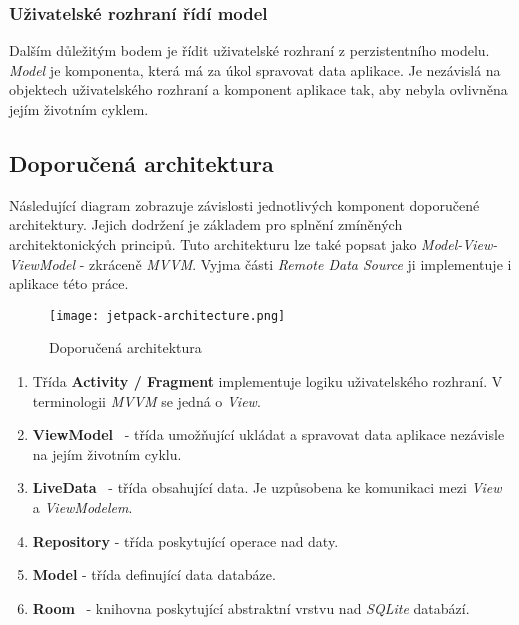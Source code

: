        \subsubsection{Uživatelské rozhraní řídí model}
        Dalším důležitým bodem je řídit uživatelské rozhraní z perzistentního modelu. \emph{Model} je komponenta, která má za úkol spravovat data aplikace. Je nezávislá na objektech uživatelského rozhraní a komponent aplikace tak, aby nebyla ovlivněna jejím životním cyklem.

        \newpage
        \subsection{Doporučená architektura}
        Následující diagram zobrazuje závislosti jednotlivých komponent doporučené architektury. Jejich dodržení je základem pro splnění zmíněných architektonických principů. Tuto architekturu lze také popsat jako \emph{Model-View-ViewModel} - zkráceně \emph{MVVM}. Vyjma části \emph{Remote Data Source} ji implementuje i aplikace této práce.

        \begin{figure}[h!]
            \centering
            \vspace{0.5cm}
            \texttt{[image: jetpack-architecture.png]}
            \caption[Architektura aplikace]{Doporučená architektura~\cite{app-architecture-guide}}
            \label{diagram:jetpack_arch}
        \end{figure}
        
        \begin{enumerate}
            \item Třída \textbf{Activity / Fragment} implementuje logiku uživatelského rozhraní. V terminologii \emph{MVVM} se jedná o \emph{View}.
            \item \textbf{ViewModel}~ - třída umožňující ukládat a spravovat data aplikace nezávisle na jejím životním cyklu.\label{arch:viewmodel}
            \item \textbf{LiveData}~\cite{livedata} - třída obsahující data. Je uzpůsobena ke komunikaci mezi \emph{View} a \emph{ViewModelem}. 
            \item \textbf{Repository} - třída poskytující operace nad daty.
            \item \textbf{Model} - třída definující data databáze.
            \item \textbf{Room}~ - knihovna poskytující abstraktní vrstvu nad \emph{SQLite} databází.
        \end{enumerate}

